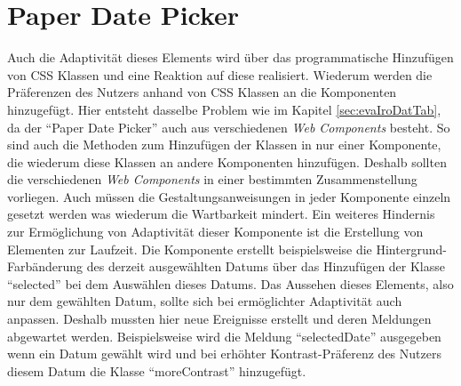 \documentclass[12pt, paper=a4, bibtotoc, toc=listof, headsepline=true, numbers=endperiod]{scrreprt}
\begin{document}
	\section{Paper Date Picker} 
	Auch die Adaptivität dieses Elements wird über das programmatische Hinzufügen von \ac{CSS} Klassen und eine Reaktion auf diese realisiert. Wiederum werden die Präferenzen des Nutzers anhand von \ac{CSS} Klassen an die Komponenten hinzugefügt. Hier entsteht dasselbe Problem wie im Kapitel \ref{sec:evaIroDatTab}, da der \enquote{Paper Date Picker} auch aus verschiedenen \emph{Web Components} besteht. So sind auch die Methoden zum Hinzufügen der Klassen in nur einer Komponente, die wiederum diese Klassen an andere Komponenten hinzufügen. Deshalb sollten die verschiedenen \emph{Web Components} in einer bestimmten Zusammenstellung vorliegen. Auch müssen die Gestaltungsanweisungen in jeder Komponente einzeln gesetzt werden was wiederum die Wartbarkeit mindert. Ein weiteres Hindernis zur Ermöglichung von Adaptivität dieser Komponente ist die Erstellung von Elementen zur Laufzeit. Die Komponente erstellt beispielsweise die Hintergrund-Farbänderung des derzeit ausgewählten Datums über das Hinzufügen der Klasse \enquote{selected} bei dem Auswählen dieses Datums. Das Aussehen dieses Elements, also nur dem gewählten Datum, sollte sich bei ermöglichter Adaptivität auch anpassen. Deshalb mussten hier neue Ereignisse erstellt und deren Meldungen abgewartet werden. Beispielsweise wird die Meldung \enquote{selectedDate} ausgegeben wenn ein Datum gewählt wird und bei erhöhter Kontrast-Präferenz des Nutzers diesem Datum die Klasse \enquote{moreContrast} hinzugefügt.
\end{document}
